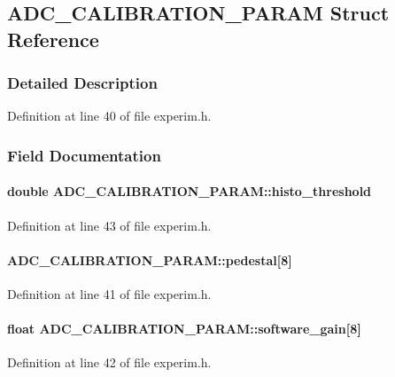 \subsection{ADC\_\-CALIBRATION\_\-PARAM Struct Reference}
\label{structADC__CALIBRATION__PARAM}


\subsubsection{Detailed Description}


Definition at line 40 of file experim.h.

\subsubsection{Field Documentation}
\paragraph[{histo\_\-threshold}]{\setlength{\rightskip}{0pt plus 5cm}double {\bf ADC\_\-CALIBRATION\_\-PARAM::histo\_\-threshold}}\hfill\label{structADC__CALIBRATION__PARAM_a843c1a85d1d9aec38b9e1b45e2749d27}


Definition at line 43 of file experim.h.
\paragraph[{pedestal}]{ {\bf ADC\_\-CALIBRATION\_\-PARAM::pedestal}\mbox{[}8\mbox{]}}\hfill\label{structADC__CALIBRATION__PARAM_af8bbdfa999799522d2063edfba7ca00a}


Definition at line 41 of file experim.h.
\paragraph[{software\_\-gain}]{\setlength{\rightskip}{0pt plus 5cm}float {\bf ADC\_\-CALIBRATION\_\-PARAM::software\_\-gain}\mbox{[}8\mbox{]}}\hfill\label{structADC__CALIBRATION__PARAM_a35a63bfdee8a1849f62b5cf893ed29ea}


Definition at line 42 of file experim.h.